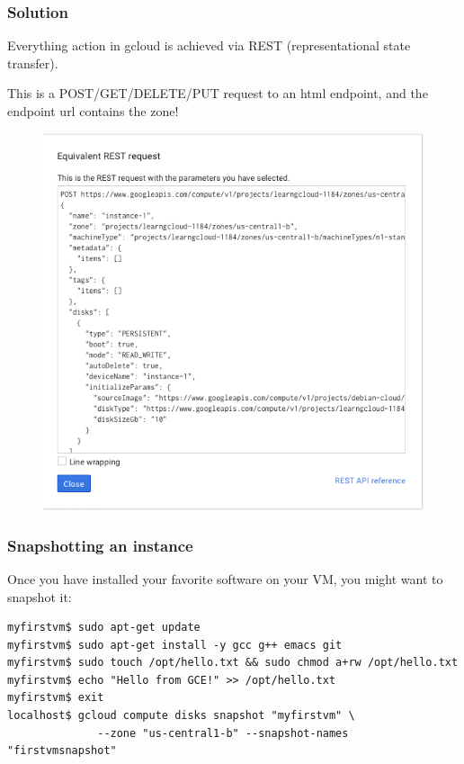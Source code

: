 \documentclass[9pt]{beamer}
\begin{document}
\begin{frame}[fragile]
\frametitle{Solution}
Everything action in gcloud is achieved via REST (representational state transfer).

This is a POST/GET/DELETE/PUT request to an html endpoint, and the endpoint url contains the zone!
\begin{figure}
\includegraphics[scale=0.3]{figures/EquivalentRest.png}
\end{figure}
\end{frame}

\begin{frame}[fragile]
\frametitle{Snapshotting an instance}
  Once you have installed your favorite software on your VM, you might want to snapshot it:
  \begin{verbatim}
myfirstvm$ sudo apt-get update
myfirstvm$ sudo apt-get install -y gcc g++ emacs git
myfirstvm$ sudo touch /opt/hello.txt && sudo chmod a+rw /opt/hello.txt
myfirstvm$ echo "Hello from GCE!" >> /opt/hello.txt
myfirstvm$ exit
localhost$ gcloud compute disks snapshot "myfirstvm" \
              --zone "us-central1-b" --snapshot-names "firstvmsnapshot"
  \end{verbatim}  
\end{frame}
\end{document}
